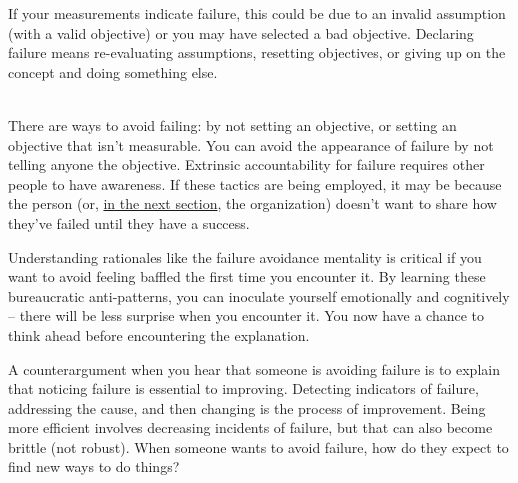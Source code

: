 If your measurements indicate failure, this could be due to an invalid assumption (with a valid objective) or you may have selected a bad objective. Declaring failure means re-evaluating assumptions, resetting objectives, or giving up on the concept and doing something else.

\ \\

There are ways to avoid failing: by not setting an objective, or setting an objective that isn't measurable. You can avoid the appearance of failure by not telling anyone the objective. Extrinsic accountability for failure requires other people to have awareness. If these tactics are being employed, it may be because the person (or, \hyperref[sec:org-failure-and-success]{in the next section},
the organization) doesn't want to share how they've failed until they have a success. 

Understanding rationales like the failure avoidance mentality is critical if you want to avoid feeling baffled the first time you encounter it. By learning these bureaucratic anti-patterns, you can inoculate yourself emotionally and cognitively -- there will be less surprise when you encounter it. You now have a chance to think ahead before encountering the explanation.

A counterargument when you hear that someone is avoiding failure is to explain that noticing failure is essential to improving. Detecting indicators of failure, addressing the cause, and then changing is the process of improvement. Being more efficient involves decreasing incidents of failure, but that can also become brittle (not robust). When someone wants to avoid failure, how do they expect to find new ways to do things? 

